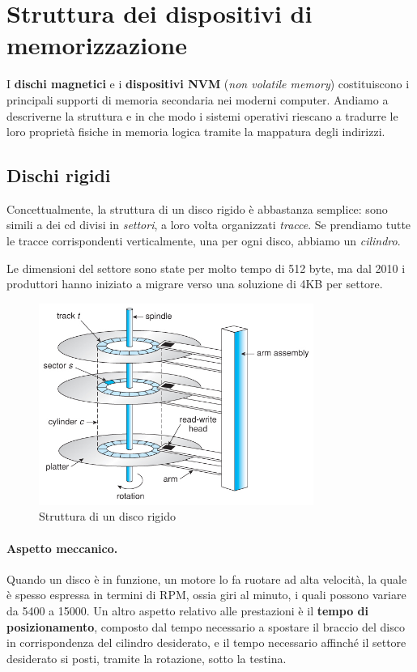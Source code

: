 \section{Struttura dei dispositivi di memorizzazione}
    I \textbf{dischi magnetici} e i \textbf{dispositivi NVM} (\textit{non volatile memory}) costituiscono i principali supporti di memoria secondaria nei moderni computer. Andiamo a descriverne la struttura e in che modo i sistemi operativi riescano a tradurre le loro proprietà fisiche in memoria logica tramite la mappatura degli indirizzi.
    
    \subsection{Dischi rigidi}
        Concettualmente, la struttura di un disco rigido è abbastanza semplice: sono simili a dei cd divisi in \textit{settori}, a loro volta organizzati \textit{tracce}. Se prendiamo tutte le tracce corrispondenti verticalmente, una per ogni disco, abbiamo un \textit{cilindro}.
        
        Le dimensioni del settore sono state per molto tempo di 512 byte, ma dal 2010 i produttori hanno iniziato a migrare verso una soluzione di 4KB per settore.
        
        \begin{figure}[h]
            \centering
            \includegraphics[width = 0.8\textwidth]{img/hd.jpg}
            \caption{Struttura di un disco rigido}
            \label{fig:my_label}
        \end{figure}
        
        \paragraph{Aspetto meccanico.} Quando un disco è in funzione, un motore lo fa ruotare ad alta velocità, la quale è spesso espressa in termini di RPM, ossia giri al minuto, i quali possono variare da 5400 a 15000. Un altro aspetto relativo alle prestazioni è il \textbf{tempo di posizionamento}, composto dal tempo necessario a spostare il braccio del disco in corrispondenza del cilindro desiderato, e il tempo necessario affinché il settore desiderato si posti, tramite la rotazione, sotto la testina.
        
